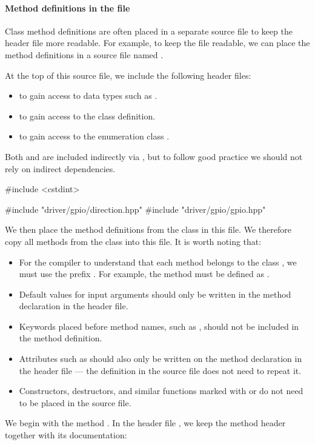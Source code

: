 \paragraph{Method definitions in the file }
Class method definitions are often placed in a separate source file to keep the header file more
readable. For example, to keep the file  readable, we can place the
method definitions in a source file named .

At the top of this source file, we include the following header files:
\begin{itemize}
  \item {} to gain access to data types such as .
  \item {} to gain access to the class definition.
  \item {} to gain access to the enumeration class .
\end{itemize}
\note Both  and  are included indirectly via
, but to follow good practice we should not rely on indirect
dependencies.

\begin{cppcode}
#include <cstdint>

#include "driver/gpio/direction.hpp"
#include "driver/gpio/gpio.hpp"
\end{cppcode}

\noindent We then place the method definitions from the class  in this file. We therefore
copy all methods from the class  into this file. It is worth noting that:
\begin{itemize}
  \item For the compiler to understand that each method belongs to the class , we must
    use the prefix . For example, the method  must be defined as
    .
  \item Default values for input arguments should only be written in the method declaration in the
    header file.
  \item Keywords placed before method names, such as , should not be included in the
    method definition.
  \item Attributes such as \code{[[nodiscard]]} should also only be written on the method
    declaration in the header file --- the definition in the source file does not need to repeat
    it.
  \item Constructors, destructors, and similar functions marked with  or
     do not need to be placed in the source file.
\end{itemize}
We begin with the method . In the header file , we keep the
method header together with its documentation:

